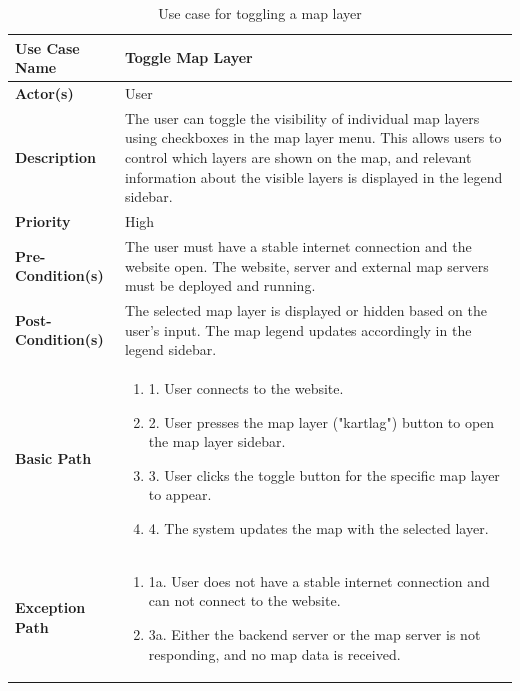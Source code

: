 \begin{table}[h]
    \centering
    \begin{tabularx}{\textwidth}{|l|X|}
        \hline
        \rowcolor{gray!20}
        \textbf{Use Case Name} & Toggle Map Layer \\
        \hline
        \textbf{Actor(s)} & User \\
        \hline
        \textbf{Description} & The user can toggle the visibility of individual map layers using checkboxes in the map layer menu. This allows users to control which layers are shown on the map, and relevant information about the visible layers is displayed in the legend sidebar. \\
        \hline
        \textbf{Priority} & High \\
        \hline
        \textbf{Pre-Condition(s)} & The user must have a stable internet connection and the website open. The website, server and external map servers must be deployed and running.\\
        \hline
        \textbf{Post-Condition(s)} & The selected map layer is displayed or hidden based on the user's input. The map legend updates accordingly in the legend sidebar. \\
        \hline
        \textbf{Basic Path} &  
        \begin{enumerate}[label=,left=0pt]
            \item 1. User connects to the website.
            \item 2. User presses the map layer ("kartlag") button to open the map layer sidebar.
            \item 3. User clicks the toggle button for the specific map layer to appear.
            \item 4. The system updates the map with the selected layer.
        \end{enumerate} \\
        \hline
        \textbf{Exception Path} & 
        \begin{enumerate}[label=,left=0pt]
            \item 1a. User does not have a stable internet connection and can not connect to the website.
            \item 3a. Either the backend server or the map server is not responding, and no map data is received.
        \end{enumerate} \\
        \hline
    \end{tabularx}
    \caption[Use Case Specification: Toggle Map Layer]{Use case for toggling a map layer}
    \label{tab:use_case_toggle_layer}
\end{table}


